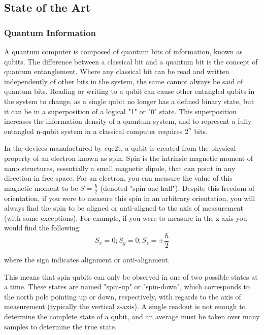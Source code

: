 \label{sec::theory}
\subsection{State of the Art}
\subsubsection{Quantum Information}
	A quantum computer is composed of quantum bits of information, known as qubits. The difference between a classical bit and a quantum bit is the concept of quantum entanglement. Where any classical bit can be read and written independently of other bits in the system, the same cannot always be said of quantum bits. Reading or writing to a qubit can cause other entangled qubits in the system to change, as a single qubit no longer has a defined binary state, but it can be in a superposition of a logical "1" or "0" state. This superposition increases the information density of a quantum system, and to represent a fully entangled n-qubit system in a classical computer requires $2^n$ bits. \cite{bennett2000quantum}
	
	In the devices manufactured by \gls{cqc2t}, a qubit is created from the physical property of an electron known as spin. Spin is the intrinsic magnetic moment of nano structures, essentially a small magnetic dipole, that can point in any direction in free space. For an electron, you can measure the value of this magnetic moment to be $S = \frac{\hbar}{2}$ (denoted "spin one half"). Despite this freedom of orientation, if you were to measure this spin in an arbitrary orientation, you will always find the spin to be aligned or anti-aligned to the axis of measurement (with some exceptions). For example, if you were to measure in the z-axis you would find the following:
	$$S_x = 0; S_y = 0; S_z = \pm\frac{\hbar}{2}$$
	
	where the sign indicates alignment or anti-alignment.
	
	This means that spin qubits can only be observed in one of two possible states at a time. These states are named "spin-up" or "spin-down", which corresponds to the north pole pointing up or down, respectively, with regards to the axis of measurement (typically the vertical z-axis). A single readout is not enough to determine the complete state of a qubit, and an average must be taken over many samples to determine the true state. \\
	
